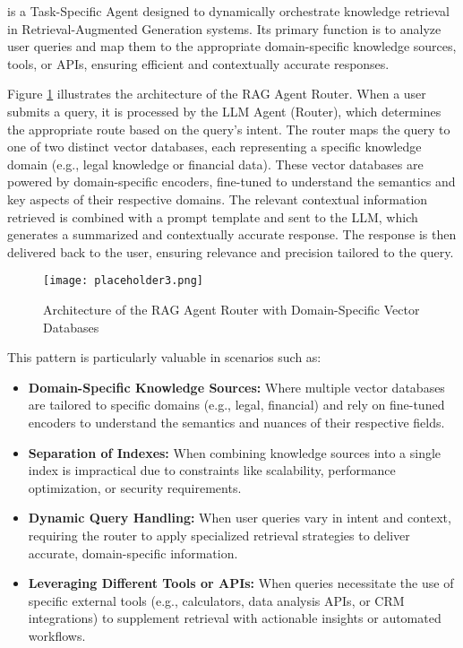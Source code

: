 \documentclass[12pt]{article}
\begin{document}
is a Task-Specific Agent designed to dynamically orchestrate knowledge retrieval in Retrieval-Augmented Generation systems. Its primary function is to analyze user queries and map them to the appropriate domain-specific knowledge sources, tools, or APIs, ensuring efficient and contextually accurate responses.

Figure \ref{fig:rag_router} illustrates the architecture of the RAG Agent Router. When a user submits a query, it is processed by the LLM Agent (Router), which determines the appropriate route based on the query's intent. The router maps the query to one of two distinct vector databases, each representing a specific knowledge domain (e.g., legal knowledge or financial data). These vector databases are powered by domain-specific encoders, fine-tuned to understand the semantics and key aspects of their respective domains. The relevant contextual information retrieved is combined with a prompt template and sent to the LLM, which generates a summarized and contextually accurate response. The response is then delivered back to the user, ensuring relevance and precision tailored to the query.

\begin{figure}[h!]
    \centering
    \texttt{[image: placeholder3.png]}
    \caption{Architecture of the RAG Agent Router with Domain-Specific Vector Databases}
    \label{fig:rag_router}
\end{figure}

This pattern is particularly valuable in scenarios such as:
\begin{itemize}
    \item \textbf{Domain-Specific Knowledge Sources:} Where multiple vector databases are tailored to specific domains (e.g., legal, financial) and rely on fine-tuned encoders to understand the semantics and nuances of their respective fields.
    \item \textbf{Separation of Indexes:} When combining knowledge sources into a single index is impractical due to constraints like scalability, performance optimization, or security requirements.
    \item \textbf{Dynamic Query Handling:} When user queries vary in intent and context, requiring the router to apply specialized retrieval strategies to deliver accurate, domain-specific information.
    \item \textbf{Leveraging Different Tools or APIs:} When queries necessitate the use of specific external tools (e.g., calculators, data analysis APIs, or CRM integrations) to supplement retrieval with actionable insights or automated workflows.
\end{itemize}
\end{document}
